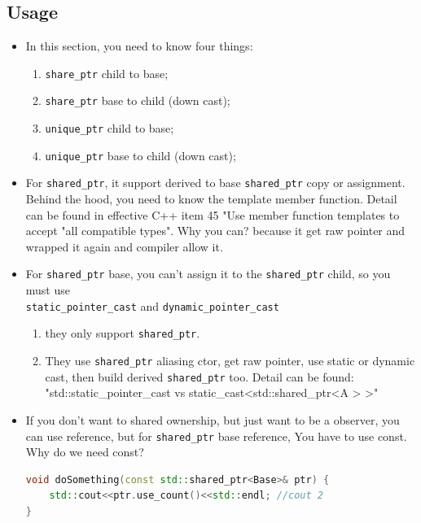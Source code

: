 \documentclass[a4paper,11pt,twoside]{book}
\begin{document}
\subsection{Usage}
\begin{itemize}
\item In this section, you need to know four things:
\begin{enumerate}
\item \texttt{share\_ptr} child to base;
\item \texttt{share\_ptr} base to child (down cast);
\item \texttt{unique\_ptr} child to base;
\item \texttt{unique\_ptr} base to child (down cast);
\end{enumerate}


		\item For \texttt{shared\_ptr}, it support derived to base \texttt{shared\_ptr} copy or assignment. Behind the hood, you need to know the template member function. Detail can be found in effective C++ item 45 "Use member function templates to accept "all compatible types". Why you can? because it get raw pointer and wrapped it again and compiler allow it.

		\item  For \texttt{shared\_ptr} base, you can't assign it to the \texttt{shared\_ptr} child, so you must use \\ \texttt{static\_pointer\_cast} and \texttt{dynamic\_pointer\_cast}
		\begin{enumerate}
			\item they only support \texttt{shared\_ptr}.
			\item They use \texttt{shared\_ptr} aliasing ctor, get raw pointer, use static or dynamic cast, then build derived \texttt{shared\_ptr} too. Detail can be found: \\
			"std::static\_pointer\_cast vs static\_cast<std::shared\_ptr<A > >"
		\end{enumerate}

		\item If you don't want to shared ownership, but just want to be a observer, you can use reference, but for \texttt{shared\_ptr} base reference, You have to use const. Why do we need const?
	
\begin{lstlisting}[frame=single, language=c++, mathescape=true]
void doSomething(const std::shared_ptr<Base>& ptr) {
    std::cout<<ptr.use_count()<<std::endl; //cout 2
}


\end{lstlisting}
\end{itemize}
\end{document}
